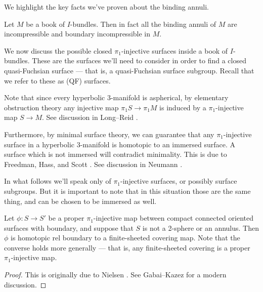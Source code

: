 We highlight the key facts we've proven about the binding annuli.

\begin{cor}

Let $M$ be a book of $I$-bundles. Then in fact all the binding annuli of $M$
are incompressible and boundary incompressible in $M$.

\end{cor}

We now discuss the possible closed $\pi_1$-injective surfaces inside a book of
$I$-bundles. These are the surfaces we'll need to consider in order to find
a closed quasi-Fuchsian surface --- that is, a quasi-Fuchsian surface subgroup.
Recall that we refer to these as (QF) surfaces.

Note that since every hyperbolic $3$-manifold is aspherical, by elementary
obstruction theory any injective map $\pi_1S \to \pi_1M$ is induced by
a $\pi_1$-injective map $S \to M$. See discussion in Long--Reid \cite[Section
1.1]{LR}.

Furthermore, by minimal surface theory, we can guarantee that any
$\pi_1$-injective surface in a hyperbolic $3$-manifold is homotopic to an
immersed surface.  A surface which is not immersed will contradict minimality.
This is due to Freedman, Hass, and Scott \cite{FreedmanHassScott}. See
discussion in Neumann \cite[Section 1]{Neu}.

In what follows we'll speak only of $\pi_1$-injective surfaces, or possibly
surface subgroups. But it is important to note that in this situation those are
the same thing, and can be chosen to be immersed as well.

\begin{lemma}\label{L:covering}

Let $\phi\colon S \to S'$ be a proper $\pi_1$-injective map between compact
connected oriented surfaces with boundary, and suppose that $S$ is not
a 2-sphere or an annulus.  Then $\phi$ is homotopic rel boundary to
a finite-sheeted covering map.  Note that the converse holds more generally ---
that is, any finite-sheeted covering is a proper $\pi_1$-injective map.

\end{lemma}

\begin{proof}

This is originally due to Nielsen \cite{Nielsen}. See Gabai--Kazez
\cite{GabaiKazez} for a modern discussion.

\end{proof}


